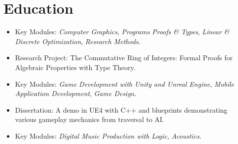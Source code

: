 \documentclass[a4paper, 10pt, nocolor, roman, final]{moderncv}
\begin{document}
\section{Education}
\begin{itemize}
\item Key Modules: \textit{Computer Graphics}, \textit{Programs Proofs \& Types}, \textit{Linear \& Discrete Optimization}, \textit{Research Methods}.
\item Research Project: The Commutative Ring of Integers: Formal Proofs for Algebraic Properties with Type Theory.\\
\end{itemize}
\vspace{-1mm}
\begin{itemize}
\item Key Modules: \textit{Game Development with Unity and Unreal Engine}, \textit{Mobile Application Development}, \textit{Game Design}.
\item Dissertation: A demo in UE4 with C++ and blueprints demonstrating various gameplay mechanics from traversal to AI.
\end{itemize}
\vspace{2mm}
\begin{itemize}
\item Key Modules: \textit{Digital Music Production with Logic}, \textit{Acoustics}.
\end{itemize}
\end{document}
